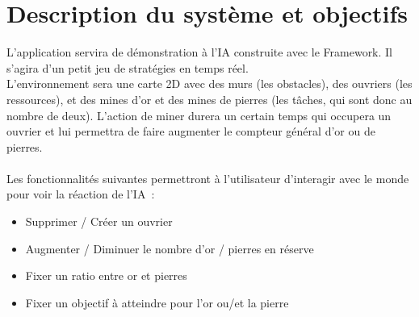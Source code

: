 \section{Description du système et objectifs}

L'application servira de démonstration à l'IA construite avec le Framework. Il s'agira d'un petit jeu de stratégies en temps réel.\\
L'environnement sera une carte 2D avec des murs (les obstacles), des ouvriers (les ressources), et des mines d'or et des mines de pierres (les tâches, qui sont donc au nombre de deux). L'action de miner durera un certain temps qui occupera un ouvrier et lui permettra de faire augmenter le compteur général d'or ou de pierres.\\\\

Les fonctionnalités suivantes permettront à l'utilisateur d'interagir avec le monde pour voir la réaction de l'IA :
\begin{itemize}
\item Supprimer / Créer un ouvrier
\item Augmenter / Diminuer le nombre d'or / pierres en réserve
\item Fixer un ratio entre or et pierres
\item Fixer un objectif à atteindre pour l'or ou/et la pierre
\end{itemize}

